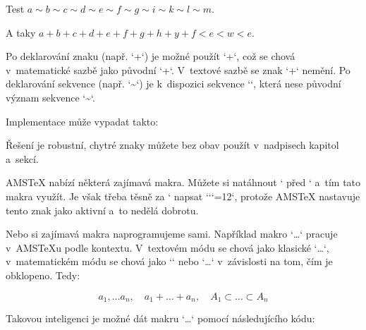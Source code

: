 \hsize=5cm 
Test $a\sim b\sim c\sim d\sim e\sim f\sim g\sim i\sim k\sim l\sim m$. 
 
A taky $a+b+c+d+e+f+g+h+y+f<e<w<e$. 
\endtt


Po deklarování znaku (např. `\mrepeatchar+`) je možné použít `\NR+`, což se chová v~matematické sazbě jako původní `+`. V~textové sazbě se znak `+` nemění. Po deklarování sekvence (např. `\mrepeatcs \sim \relax`) je k~dispozici sekvence `\NRsim`, která nese původní význam sekvence `\sim`. 



Implementace může vypadat takto: 

\begtt
\def\NR#1{\csname NR:\string#1\endcsname} 
\def\mrepset#1{\begingroup \lccode`\~=`#1\lowercase{\endgroup\edef~}} 
\def\mrepeatchar#1{%
   \isNRno\NR#1{\mathchardef\NR#1=\mathcode`#1 }%
   \mrepset#1{\NR#1\nobreak \discretionary{}{\hbox{$\NR#1$}}{}} 
   \mathcode`#1="8000 
} 
\def\NRs#1{\csname NR\expandafter\NRx\string#1\endcsname} \def\NRx#1{} 
\def\mrepeatcs#1{\ifx#1\relax \else 
   \isNRno\NRs#1{\let\NRs#1=#1}%
   \edef#1{\NRs#1\noexpand\nobreak \discretionary{}{\hbox{$\NRs#1$}}{}}%
   \expandafter\mrepeatcs\fi 
} 
\def\isNRno#1#2#3{\expandafter\expandafter\expandafter\ifx#1#2\relax 
   \expandafter\expandafter\expandafter#3\else 
   \message{\string#2\space declared already}\fi} 
\endtt


Řešení je robustní, chytré znaky můžete bez obav použít v~nadpisech kapitol a~sekcí. 


 


AMSTeX nabízí některá zajímavá makra. Můžete si natáhnout ` před ` a~tím tato makra využít. Je však třeba těsně za ` napsat `\catcode`{\tt{}}`\@=12`, protože AMSTeX nastavuje tento znak jako aktivní a~to nedělá dobrotu. 



Nebo si zajímavá makra naprogramujeme sami. Například makro `\dots` pracuje v~AMSTeXu podle kontextu. V~textovém módu se chová jako klasické `\dots`, v~matematickém módu se chová jako `\cdots` nebo `\ldots` v~závislosti na tom, čím je obklopeno. Tedy: 

\begtt
$$ 
  a_1,\dots a_n, \quad           %
  a_1 + \dots + a_n, \quad       %
  A_1 \subset \dots \subset A_n  %
$$ 
\endtt


Takovou inteligenci je možné dát makru `\dots` pomocí následujícího kódu: 

